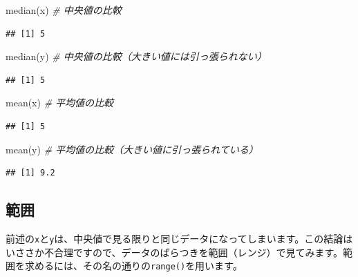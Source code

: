 \documentclass[
  12pt,
]{book}
\newenvironment{Shaded}{\begin{snugshade}}{\end{snugshade}}
\newcommand{\CommentTok}[1]{\textcolor[rgb]{0.56,0.35,0.01}{\textit{#1}}}
\newcommand{\FunctionTok}[1]{\textcolor[rgb]{0.00,0.00,0.00}{#1}}
\newcommand{\NormalTok}[1]{#1}
\begin{document}
\begin{Shaded}
\begin{Highlighting}[numbers=left,,]
\FunctionTok{median}\NormalTok{(x)                    }\CommentTok{\# 中央値の比較}
\end{Highlighting}
\end{Shaded}

\begin{verbatim}
## [1] 5
\end{verbatim}

\begin{Shaded}
\begin{Highlighting}[numbers=left,,]
\FunctionTok{median}\NormalTok{(y)                    }\CommentTok{\# 中央値の比較（大きい値には引っ張られない）}
\end{Highlighting}
\end{Shaded}

\begin{verbatim}
## [1] 5
\end{verbatim}

\begin{Shaded}
\begin{Highlighting}[numbers=left,,]
\FunctionTok{mean}\NormalTok{(x)                      }\CommentTok{\# 平均値の比較}
\end{Highlighting}
\end{Shaded}

\begin{verbatim}
## [1] 5
\end{verbatim}

\begin{Shaded}
\begin{Highlighting}[numbers=left,,]
\FunctionTok{mean}\NormalTok{(y)                      }\CommentTok{\# 平均値の比較（大きい値に引っ張られている）}
\end{Highlighting}
\end{Shaded}

\begin{verbatim}
## [1] 9.2
\end{verbatim}

\hypertarget{ux7bc4ux56f2}{%
\subsection{範囲}\label{ux7bc4ux56f2}}

前述の\texttt{x}と\texttt{y}は、中央値で見る限りと同じデータになってしまいます。この結論はいささか不合理ですので、データのばらつきを範囲（レンジ）で見てみます。範囲を求めるには、その名の通りの\texttt{range()}を用います。
\end{document}
